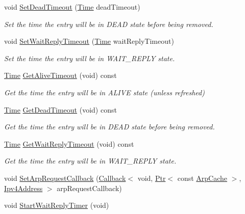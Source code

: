 \begin{DoxyCompactItemize}
void \hyperlink{classns3_1_1ArpCache_adf7d795ca712fb957b97934c1556168a}{Set\+Dead\+Timeout} (\hyperlink{classns3_1_1Time}{Time} dead\+Timeout)
\begin{DoxyCompactList}\small\item\em Set the time the entry will be in D\+E\+AD state before being removed. \end{DoxyCompactList}\item 
void \hyperlink{classns3_1_1ArpCache_a1422cb8ec06a7dc516849ee9939ebc25}{Set\+Wait\+Reply\+Timeout} (\hyperlink{classns3_1_1Time}{Time} wait\+Reply\+Timeout)
\begin{DoxyCompactList}\small\item\em Set the time the entry will be in W\+A\+I\+T\+\_\+\+R\+E\+P\+LY state. \end{DoxyCompactList}\item 
\hyperlink{classns3_1_1Time}{Time} \hyperlink{classns3_1_1ArpCache_a78dc3f3db9c7fd5f8042efcc1dfff5e8}{Get\+Alive\+Timeout} (void) const 
\begin{DoxyCompactList}\small\item\em Get the time the entry will be in A\+L\+I\+VE state (unless refreshed) \end{DoxyCompactList}\item 
\hyperlink{classns3_1_1Time}{Time} \hyperlink{classns3_1_1ArpCache_ad6b09c9735d13bb83f1a1f635b885cb9}{Get\+Dead\+Timeout} (void) const 
\begin{DoxyCompactList}\small\item\em Get the time the entry will be in D\+E\+AD state before being removed. \end{DoxyCompactList}\item 
\hyperlink{classns3_1_1Time}{Time} \hyperlink{classns3_1_1ArpCache_a0e83bb9568d72f3fa2d187a72b0abbc4}{Get\+Wait\+Reply\+Timeout} (void) const 
\begin{DoxyCompactList}\small\item\em Get the time the entry will be in W\+A\+I\+T\+\_\+\+R\+E\+P\+LY state. \end{DoxyCompactList}\item 
void \hyperlink{classns3_1_1ArpCache_a338c92360d182aa43ed6cb158ecfb959}{Set\+Arp\+Request\+Callback} (\hyperlink{classns3_1_1Callback}{Callback}$<$ void, \hyperlink{classns3_1_1Ptr}{Ptr}$<$ const \hyperlink{classns3_1_1ArpCache}{Arp\+Cache} $>$, \hyperlink{classns3_1_1Ipv4Address}{Ipv4\+Address} $>$ arp\+Request\+Callback)
\item 
void \hyperlink{classns3_1_1ArpCache_ada18c1c06844b8e43201d3d7a3a61098}{Start\+Wait\+Reply\+Timer} (void)

\end{DoxyCompactItemize}
